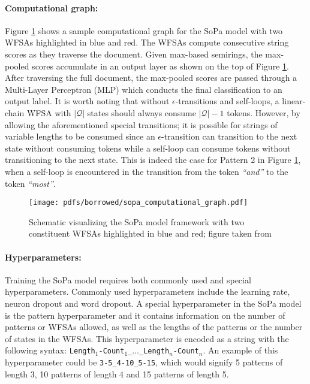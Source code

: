 \paragraph{Computational graph:} Figure \ref{fig:sopa} shows a sample computational graph for the SoPa model with two WFSAs highlighted in blue and red. The WFSAs compute consecutive string scores as they traverse the document. Given max-based semirings, the max-pooled scores accumulate in an output layer as shown on the top of Figure \ref{fig:sopa}. After traversing the full document, the max-pooled scores are passed through a Multi-Layer Perceptron (MLP) which conducts the final classification to an output label. It is worth noting that without $\epsilon$-transitions and self-loops, a linear-chain WFSA with $|\mathcal{Q}|$ states should always consume $\mathcal{|Q|}-1$ tokens. However, by allowing the aforementioned special transitions; it is possible for strings of variable lengths to be consumed since an $\epsilon$-transition can transition to the next state without consuming tokens while a self-loop can consume tokens without transitioning to the next state. This is indeed the case for Pattern 2 in Figure \ref{fig:sopa}, when a self-loop is encountered in the transition from the token \textit{``and''} to the token \textit{``most''}.

\begin{figure}[t]
  \centering
  \texttt{[image: pdfs/borrowed/sopa\_computational\_graph.pdf]}
  \caption{Schematic visualizing the SoPa model framework with two constituent WFSAs highlighted in blue and red; figure taken from \citet{schwartz2018sopa}}
  \label{fig:sopa}
\end{figure}

\paragraph{Hyperparameters:} Training the SoPa model requires both commonly used and special hyperparameters. Commonly used hyperparameters include the learning rate, neuron dropout and word dropout. A special hyperparameter in the SoPa model is the pattern hyperparameter and it contains information on the number of patterns or WFSAs allowed, as well as the lengths of the patterns or the number of states in the WFSAs. This hyperparameter is encoded as a string with the following syntax: \texttt{Length$_{1}$-Count$_{1}$\_$\dots$\_Length$_{n}$-Count$_{n}$}. An example of this hyperparameter could be \texttt{3-5\_4-10\_5-15}, which would signify 5 patterns of length 3, 10 patterns of length 4 and 15 patterns of length 5.

